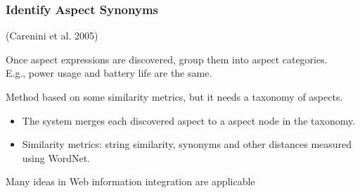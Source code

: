 \documentclass[t]{beamer}
\begin{document}

\begin{frame} \frametitle{Identify Aspect Synonyms } %

(Carenini et al.  2005)

\vfill
Once aspect expressions are discovered, group them into aspect categories.\\
E.g., power usage and battery life are the same.

\vfill
Method based on some similarity metrics, but it needs a taxonomy of aspects.
\begin{itemize}
\item The system merges each discovered aspect to a aspect node in the
taxonomy.
\item Similarity metrics: string similarity, synonyms and other distances measured using WordNet.
\end{itemize}

\vfill
Many ideas in Web information integration are applicable

\end{frame}
\end{document}
